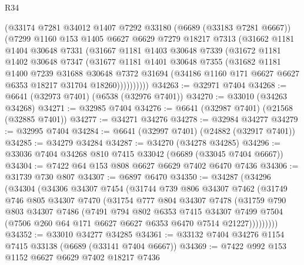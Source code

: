 \begin{lexlean}{R34}
\begin{coremodule}
        (@33174
          @7281
          @34012
          @1407
          @7292
          @33180
          (@6689 (@33183 @7281 @6667))
          (@7299
            @1160
            @153
            @1405
            @6627
            @6629
            @7279
            @18217
            @7313
            (@31662
              @1181
              @1404
              @30648
              @7331
              (@31667
                @1181
                @1403
                @30648
                @7339
                (@31672
                  @1181
                  @1402
                  @30648
                  @7347
                  (@31677
                    @1181
                    @1401
                    @30648
                    @7355
                    (@31682
                      @1181
                      @1400
                      @7239
                      @31688
                      @30648
                      @7372
                      @31694
                      (@34186 @1160 @171 @6627 @6627 @6353 @18217 @31704 @18260))))))))))
@34263 := @32971 @7404
@34268 := @6641 (@32973 @7401) (@6538 (@32976 @7401))
@34270 := @33010 (@34263 @34268)
@34271 := @32985 @7404
@34276 := @6641 (@32987 @7401) (@21568 (@32885 @7401))
@34277 := @34271 @34276
@34278 := @32984 @34277
@34279 := @32995 @7404
@34284 := @6641 (@32997 @7401) (@24882 (@32917 @7401))
@34285 := @34279 @34284
@34287 := @34270 (@34278 @34285)
@34296 := @33036 @7404 @34268 @810 @7415 @33042 (@6689 (@33045 @7404 @6667))
@34304 := @7422 @64 @153 @808 @6627 @6629 @7402 @6470 @7436
@34306 := @31739 @730 @807
@34307 := @6897 @6470
@34350 := @34287
    (@34296
      (@34304
        (@34306
          @34307
          @7454
          (@31744
            @739
            @806
            @34307
            @7462
            (@31749
              @746
              @805
              @34307
              @7470
              (@31754
                @777
                @804
                @34307
                @7478
                (@31759
                  @790
                  @803
                  @34307
                  @7486
                  (@7491
                    @794
                    @802
                    @6353
                    @7415
                    @34307
                    @7499
                    @7504
                    (@7506 @260 @64 @171 @6627 @6627 @6353 @6470 @7514 @21227)))))))))
@34352 := @33010 @34277 @34285
@34361 := @33132 @7404 @34276 @1154 @7415 @33138 (@6689 (@33141 @7404 @6667))
@34369 := @7422 @992 @153 @1152 @6627 @6629 @7402 @18217 @7436

\end{coremodule}
\end{lexlean}
